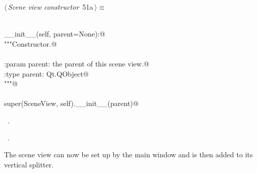 \documentclass[
    a4paper,      %
    10pt,         %
    openright,    %
    notitlepage,  %
    parskip=half, %
]{scrreprt}       %
\theoremstyle{definition}                    %
\begin{document}
\begin{flushleft} \small
\begin{minipage}{\linewidth}\label{scrap73}\raggedright\small
{} $\langle\,${\itshape Scene view constructor}\nobreak\ {\footnotesize {51a}}$\,\rangle\equiv$
\vspace{-1exm}
\begin{list}{}{} \item
\mbox{}\lstinline@@\\
\mbox{}\lstinline@def __init__(self, parent=None):@\\
\mbox{}\lstinline@    """Constructor.@\\
\mbox{}\lstinline@@\\
\mbox{}\lstinline@    :param parent: the parent of this scene view.@\\
\mbox{}\lstinline@    :type parent: Qt.QObject@\\
\mbox{}\lstinline@    """@\\
\mbox{}\lstinline@@\\
\mbox{}\lstinline@    super(SceneView, self).__init__(parent)@\\
\mbox{}\lstinline@@{\NWsep}
\end{list}
\vspace{-1.5ex}
\footnotesize
\begin{list}{}{\setlength{\itemsep}{-\parsep}\setlength{\itemindent}{-\leftmargin}}
\item \NWtxtMacroDefBy\ .
\item \NWtxtMacroRefIn\ .

\item{}
\end{list}
\end{minipage}\vspace{4ex}
\end{flushleft}
The scene view can now be set up by the main window and is then added to its
vertical splitter.
\end{document}
